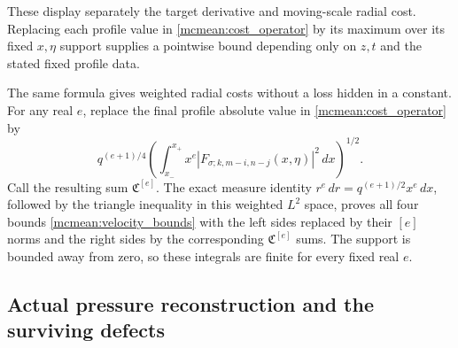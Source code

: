 \documentclass[11pt]{article}
\begin{document}
These display separately the target derivative and moving-scale radial
cost. Replacing each profile value in \eqref{mcmean:cost_operator}
by its maximum over its fixed \(x,\eta\) support supplies a pointwise
bound depending only on \(z,t\) and the stated fixed profile data.

The same formula gives weighted radial costs without a loss hidden in
a constant. For any real \(e\), replace the final profile absolute
value in \eqref{mcmean:cost_operator} by
\[
 q^{(e+1)/4}
 \left(\int_{x_-}^{x_+}x^e
          |F_{\sigma;k,m-i,n-j}(x,\eta)|^2\,dx\right)^{1/2}.
\]
Call the resulting sum \(\mathfrak C^{[e]}\). The exact measure
identity \(r^e\,dr=q^{(e+1)/2}x^e\,dx\), followed by the triangle
inequality in this weighted \(L^2\) space, proves all four bounds
\eqref{mcmean:velocity_bounds} with the left sides replaced by their
\([e]\) norms and the right sides by the corresponding
\(\mathfrak C^{[e]}\) sums. The support is bounded away from zero,
so these integrals are finite for every fixed real \(e\).

\subsection{Actual pressure reconstruction and the surviving defects}
\end{document}
